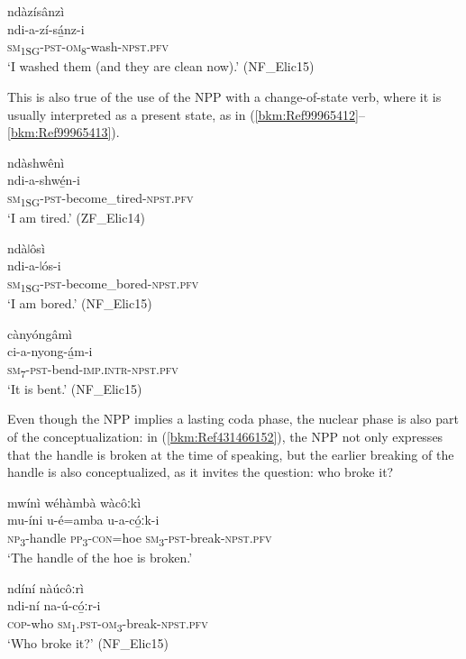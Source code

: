 \ea
\label{bkm:Ref98834714}
\glll ndàzísânzì\\
ndi-a-zí-sá̲nz-i\\
\textsc{sm}\textsubscript{1SG}-\textsc{pst}-\textsc{om}\textsubscript{8}-wash-\textsc{npst}.\textsc{pfv}\\
\glt ‘I washed them (and they are clean now).’ (NF\_Elic15)
\z

This is also true of the use of the NPP with a change-of-state verb, where it is usually interpreted as a present state, as in (\ref{bkm:Ref99965412}--\ref{bkm:Ref99965413}).

\ea
\label{bkm:Ref99965412}
\glll ndàshwênì\\
ndi-a-shwé̲n-i\\
\textsc{sm}\textsubscript{1SG}-\textsc{pst}-become\_tired-\textsc{npst}.\textsc{pfv}\\
\glt ‘I am tired.’ (ZF\_Elic14)
\z

\ea
\glll ndàǀôsì\\
ndi-a-ǀós-i\\
\textsc{sm}\textsubscript{1SG}-\textsc{pst}-become\_bored-\textsc{npst}.\textsc{pfv}\\
\glt ‘I am bored.’ (NF\_Elic15)
\z

\ea
\label{bkm:Ref99965413}
\glll cànyóngâmì\\
ci-a-nyong-á̲m-i\\
\textsc{sm}\textsubscript{7}-\textsc{pst}-bend-\textsc{imp}.\textsc{intr}-\textsc{npst}.\textsc{pfv}\\
\glt ‘It is bent.’ (NF\_Elic15)
\z

Even though the NPP implies a lasting coda phase, the nuclear phase is also part of the conceptualization: in (\ref{bkm:Ref431466152}), the NPP not only expresses that the handle is broken at the time of speaking, but the earlier breaking of the handle is also conceptualized, as it invites the question: who broke it?

\ea
\label{bkm:Ref431466152}
\ea
mwínì wéhàmbà wàcôːkì\\
\gll mu-íni  u-é=amba    u-a-có̲ːk-i\\
\textsc{np}\textsubscript{3}-handle  \textsc{pp}\textsubscript{3}-\textsc{con}=hoe  \textsc{sm}\textsubscript{3}-\textsc{pst}-break-\textsc{npst}.\textsc{pfv}\\
\glt ‘The handle of the hoe is broken.’

\ex
ndíní nàúcôːrì\\
\gll ndi-ní    na-ú-có̲ːr-i\\
\textsc{cop}-who  \textsc{sm}\textsubscript{1}.\textsc{pst}-\textsc{om}\textsubscript{3}-break-\textsc{npst}.\textsc{pfv}\\
\glt ‘Who broke it?’ (NF\_Elic15)
\z\z

